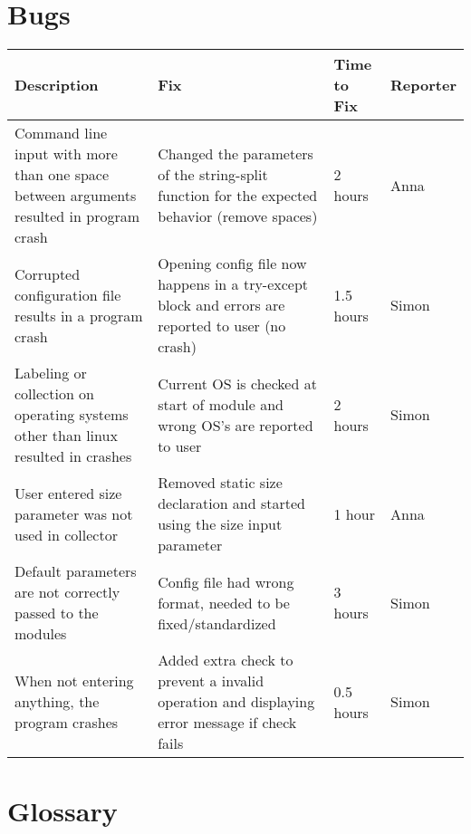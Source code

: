 \documentclass[parskip=full]{scrartcl}
\begin{document}
\section{Bugs}
\begin{tabular}{|p{4.5cm}|p{4.5cm}|p{2cm}|p{1.5cm}|}

\hline

 Description  & Fix & Time to Fix & Reporter  \\

\hline

Command line input with more than one space between arguments resulted in program crash & 
Changed the parameters of the string-split function for the expected behavior (remove spaces) &
2 hours &
Anna \\

\hline

Corrupted configuration file results in a program crash &
Opening config file now happens in a try-except block and errors are reported to user (no crash) &
1.5 hours &
Simon \\

\hline

Labeling or collection on operating systems other than linux resulted in crashes &
Current OS is checked at start of module and wrong OS's are reported to user &
2 hours &
Simon\\

\hline

User entered size parameter was not used in collector &
Removed static size declaration and started using the size input parameter &
1 hour &
Anna \\

\hline

Default parameters are not correctly passed to the modules &
Config file had wrong format, needed to be fixed/standardized &
3 hours &
Simon \\

\hline

When not entering anything, the program crashes &
Added extra check to prevent a invalid operation and displaying error message if check fails &
0.5 hours &
Simon \\

\hline
\end{tabular}

\newpage
\section{Glossary}

%
\printnoidxglossaries
\end{document}

